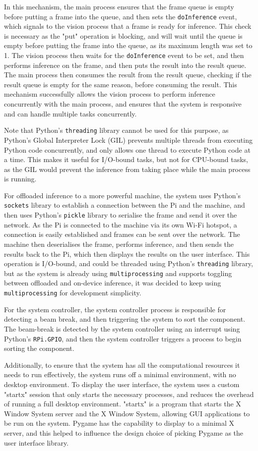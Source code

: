 In this mechanism, the main process ensures that the frame queue is empty before putting a frame into the queue, and then sets the \texttt{doInference} event, which signals to the vision process that a frame is ready for inference. This check is necessary as the "put" operation is blocking, and will wait until the queue is empty before putting the frame into the queue, as its maximum length was set to 1. The vision process then waits for the \texttt{doInference} event to be set, and then performs inference on the frame, and then puts the result into the result queue. The main process then consumes the result from the result queue, checking if the result queue is empty for the same reason, before consuming the result. This mechanism successfully allows the vision process to perform inference concurrently with the main process, and ensures that the system is responsive and can handle multiple tasks concurrently.

Note that Python's \texttt{threading} library cannot be used for this purpose, as Python's Global Interpreter Lock (GIL) prevents multiple threads from executing Python code concurrently, and only allows one thread to execute Python code at a time. This makes it useful for I/O-bound tasks, but not for CPU-bound tasks, as the GIL would prevent the inference from taking place while the main process is running.

For offloaded inference to a more powerful machine, the system uses Python's \texttt{sockets} library to establish a connection between the Pi and the machine, and then uses Python's \texttt{pickle} library to serialise the frame and send it over the network. As the Pi is connected to the machine via its own Wi-Fi hotspot, a connection is easily established and frames can be sent over the network. The machine then deserialises the frame, performs inference, and then sends the results back to the Pi, which then displays the results on the user interface. This operation is I/O-bound, and could be threaded using Python's \texttt{threading} library, but as the system is already using \texttt{multiprocessing} and supports toggling between offloaded and on-device inference, it was decided to keep using \texttt{multiprocessing} for development simplicity.

For the system controller, the system controller process is responsible for detecting a beam break, and then triggering the system to sort the component. The beam-break is detected by the system controller using an interrupt using Python's \texttt{RPi.GPIO}, and then the system controller triggers a process to begin sorting the component.

Additionally, to ensure that the system has all the computational resources it needs to run effectively, the system runs off a minimal environment, with no desktop environment. To display the user interface, the system uses a custom "startx" session that only starts the necessary processes, and reduces the overhead of running a full desktop environment. "startx" is a program that starts the X Window System server and the X Window System, allowing GUI applications to be run on the system. Pygame has the capability to display to a minimal X server, and this helped to influence the design choice of picking Pygame as the user interface library.


